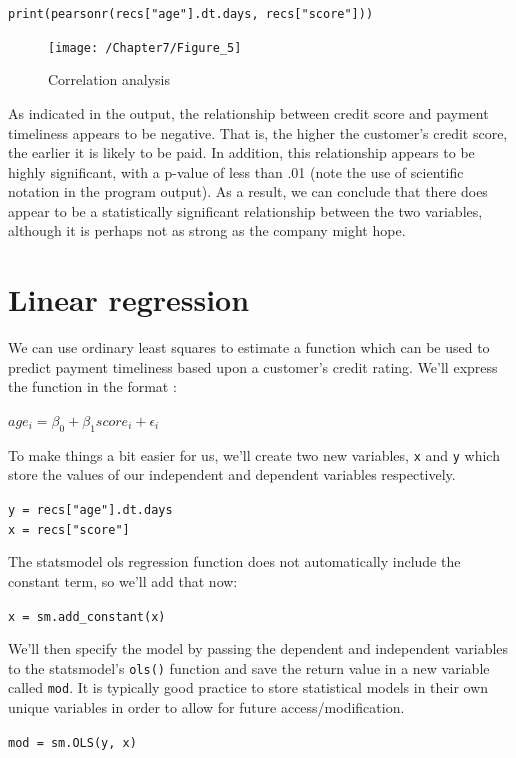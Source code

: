\documentclass{book}
\begin{document}
\texttt{print(pearsonr(recs["age"].dt.days, recs["score"]))}

\begin{figure}[h]
	\caption{Correlation analysis}
	\centering\texttt{[image: /Chapter7/Figure\_5]}
\end{figure}

As indicated in the output, the relationship between credit score and payment timeliness appears to be negative. That is, the higher the customer's credit score, the earlier it is likely to be paid. In addition, this relationship appears to be highly significant, with a p-value of less than .01 (note the use of scientific notation in the program output). As a result, we can conclude that there does appear to be a statistically significant relationship between the two variables, although it is perhaps not as strong as the company might hope.

\section{Linear regression}
We can use ordinary least squares to estimate a function which can be used to predict payment timeliness based upon a customer's credit rating. We'll express the function in the format :

\begin{center}
\begin{math}
age_i = \beta_0 + \beta_1 score_i + \epsilon_i
\end{math}
\end{center}

To make things a bit easier for us, we'll create two new variables, \texttt{x} and \texttt{y} which store the values of our independent and dependent variables respectively. 

\texttt{y = recs["age"].dt.days \\x = recs["score"]}

The statsmodel ols regression function does not automatically include the constant term, so we'll add that now:

\texttt{x = sm.add\_constant(x)}

We'll then specify the model by passing the dependent and independent variables to the statsmodel's \texttt{ols()} function and save the return value in a new variable called \texttt{mod}. It is typically good practice to store statistical models in their own unique variables in order to allow for future access/modification.

\texttt{mod = sm.OLS(y, x)}
\end{document}
